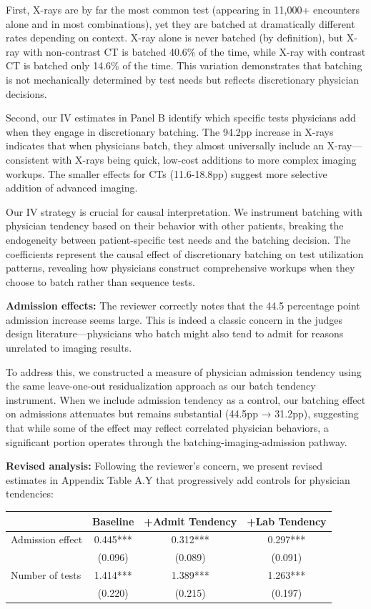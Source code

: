 \documentclass[11pt]{article}
\newcommand{\1}{\hbox{\rm 1\kern-.35em 1}}
\begin{document}
{First, X-rays are by far the most common test (appearing in 11,000+ encounters alone and in most combinations), yet they are batched at dramatically different rates depending on context. X-ray alone is never batched (by definition), but X-ray with non-contrast CT is batched 40.6\% of the time, while X-ray with contrast CT is batched only 14.6\% of the time. This variation demonstrates that batching is not mechanically determined by test needs but reflects discretionary physician decisions.

Second, our IV estimates in Panel B identify which specific tests physicians add when they engage in discretionary batching. The 94.2pp increase in X-rays indicates that when physicians batch, they almost universally include an X-ray—consistent with X-rays being quick, low-cost additions to more complex imaging workups. The smaller effects for CTs (11.6-18.8pp) suggest more selective addition of advanced imaging.

Our IV strategy is crucial for causal interpretation. We instrument batching with physician tendency based on their behavior with other patients, breaking the endogeneity between patient-specific test needs and the batching decision. The coefficients represent the causal effect of discretionary batching on test utilization patterns, revealing how physicians construct comprehensive workups when they choose to batch rather than sequence tests.


\textbf{Admission effects:}
The reviewer correctly notes that the 44.5 percentage point admission increase seems large. This is indeed a classic concern in the judges design literature—physicians who batch might also tend to admit for reasons unrelated to imaging results.

To address this, we constructed a measure of physician admission tendency using the same leave-one-out residualization approach as our batch tendency instrument. When we include admission tendency as a control, our batching effect on admissions attenuates but remains substantial (44.5pp → 31.2pp), suggesting that while some of the effect may reflect correlated physician behaviors, a significant portion operates through the batching-imaging-admission pathway.

\textbf{Revised analysis:}
Following the reviewer's concern, we present revised estimates in Appendix Table A.Y that progressively add controls for physician tendencies:

\begin{table}[h]
\centering
\begin{tabular}{lccc}
\toprule
& Baseline & +Admit Tendency & +Lab Tendency \\
\midrule
Admission effect & 0.445*** & 0.312*** & 0.297*** \\
& (0.096) & (0.089) & (0.091) \\
Number of tests & 1.414*** & 1.389*** & 1.263*** \\
& (0.220) & (0.215) & (0.197) \\
\bottomrule
\end{tabular}
\end{table}

}
\end{document}
